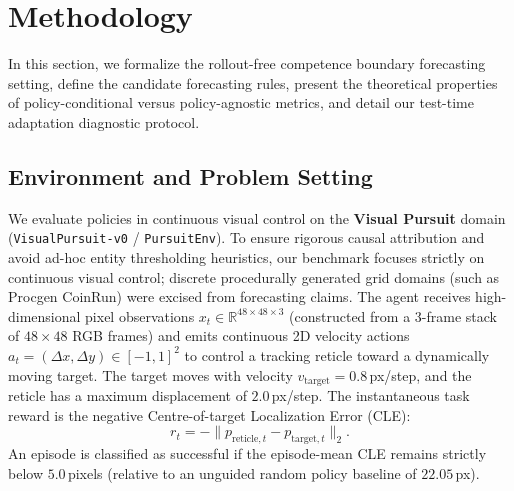 \section{Methodology}
\label{sec:method}

In this section, we formalize the rollout-free competence boundary forecasting setting, define the candidate forecasting rules, present the theoretical properties of policy-conditional versus policy-agnostic metrics, and detail our test-time adaptation diagnostic protocol.

\subsection{Environment and Problem Setting}
\label{sec:method:env}

We evaluate policies in continuous visual control on the \textbf{Visual Pursuit} domain (\texttt{VisualPursuit-v0} / \texttt{PursuitEnv}).
To ensure rigorous causal attribution and avoid ad-hoc entity thresholding heuristics, our benchmark focuses strictly on continuous visual control; discrete procedurally generated grid domains (such as Procgen CoinRun) were excised from forecasting claims.
The agent receives high-dimensional pixel observations $x_t \in \mathbb{R}^{48 \times 48 \times 3}$ (constructed from a 3-frame stack of $48 \times 48$ RGB frames) and emits continuous 2D velocity actions $a_t = (\Delta x, \Delta y) \in [-1, 1]^2$ to control a tracking reticle toward a dynamically moving target.
The target moves with velocity $v_{\mathrm{target}} = 0.8$\,px/step, and the reticle has a maximum displacement of $2.0$\,px/step.
The instantaneous task reward is the negative Centre-of-target Localization Error (CLE):
\begin{equation}
    r_t = - \|p_{\mathrm{reticle}, t} - p_{\mathrm{target}, t}\|_2.
\end{equation}
An episode is classified as successful if the episode-mean CLE remains strictly below $5.0$\,pixels (relative to an unguided random policy baseline of $22.05$\,px).

